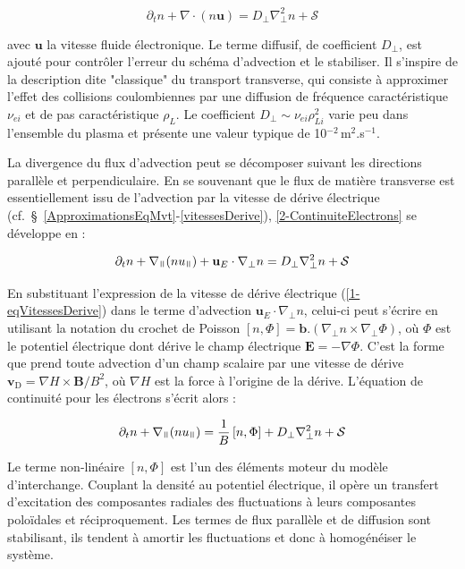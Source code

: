 \begin{refsection}
\begin{equation}
\label{2-ContinuiteElectrons}
\partial_t n + \nabla\cdot(n\mathbf{u}) = D_\perp\nabla^2_\perp n + \mathcal{S}
\end{equation}

avec $\mathbf u$ la vitesse fluide électronique. Le terme diffusif, de
coefficient $D_\perp$, est ajouté pour contrôler l'erreur du schéma d'advection et le stabiliser. Il s'inspire de la description
dite "classique" du transport transverse, qui consiste à approximer l'effet des
collisions coulombiennes par une diffusion de fréquence caractéristique
$\nu_{ei}$ et de pas caractéristique $\rho_{L}$. Le coefficient
$D_\perp\sim\nu_{ei}\rho_{Li}^2$ varie peu dans l'ensemble du plasma et présente
une valeur typique de 10$^{-2}\,$m$^2$.s$^{-1}$.

La divergence du flux d'advection peut se décomposer suivant les directions
parallèle et perpendiculaire. En se souvenant que le flux de matière
transverse est essentiellement issu de l'advection par la vitesse de dérive électrique
(cf.~\S~\ref{ApproximationsEqMvt}-\ref{vitessesDerive}), \eqref{2-ContinuiteElectrons}
se développe en :

\begin{equation}
\label{2-ContinuiteElectrons2}
\partial_t n + \nabla_\para(nu_{\para}) +
\mathbf{u}_E\cdot\nabla_\perp n = D_\perp\nabla^2_\perp n + \mathcal{S}
\end{equation}

En substituant l'expression de la vitesse de dérive électrique
(\eqref{1-eqVitessesDerive}) dans le terme d'advection
$\mathbf{u}_E\cdot\nabla_\perp n$, celui-ci peut s'écrire en utilisant la
notation du crochet de Poisson $[n,\Phi]=\mathbf{b}.(\nabla_\perp
n\times\nabla_\perp\Phi)$, où $\Phi$ est le potentiel
électrique dont dérive le champ électrique $\mathbf E=-\nabla\Phi$. C'est la
forme que prend toute advection d'un champ scalaire par une vitesse de dérive
$\mathbf{v}_\text{D}=\nabla H\times\mathbf{B}/B^2$, où $\nabla H$ est la force
à l'origine de la dérive. L'équation de continuité pour les électrons s'écrit alors :

\begin{equation}
\label{2-eqContinuiteFinale}
\partial_t n + \nabla_{\para}(nu_{\para}) =
\frac{1}{B}\left[n,\Phi\right] + D_\perp\nabla^2_\perp n + \mathcal{S}
\end{equation}

Le terme non-linéaire $[n,\Phi]$ est l'un des éléments moteur du modèle
d'interchange. Couplant la densité au potentiel électrique, il opère un
transfert d'excitation des composantes radiales des fluctuations à leurs
composantes poloïdales et réciproquement. Les termes de flux parallèle et de
diffusion sont stabilisant, ils tendent à
amortir les fluctuations et donc à homogénéiser le système.


\end{refsection}
